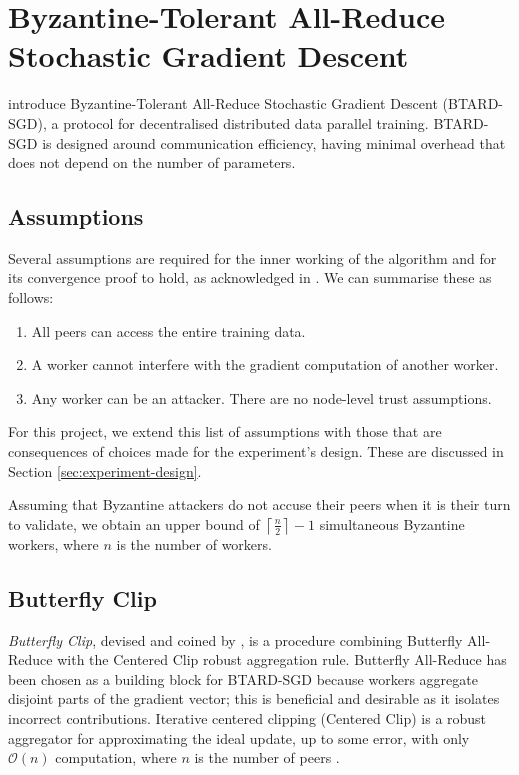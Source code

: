 \documentclass{article}
\begin{document}
\section{Byzantine-Tolerant All-Reduce Stochastic Gradient Descent}

\cite{gorbunov2021secure} introduce Byzantine-Tolerant All-Reduce Stochastic Gradient Descent (BTARD-SGD), a protocol for decentralised distributed data parallel training. BTARD-SGD is designed around communication efficiency, having minimal overhead that does not depend on the number of parameters. 

\subsection{Assumptions}
Several assumptions are required for the inner working of the algorithm and for its convergence proof to hold, as acknowledged in \cite{gorbunov2021secure}. We can summarise these as follows:
\begin{enumerate}
\item All peers can access the entire training data.
\item A worker cannot interfere with the gradient computation of another worker. 
\item Any worker can be an attacker. There are no node-level trust assumptions.
\end{enumerate}

For this project, we extend this list of assumptions with those that are consequences of choices made for the experiment's design. These are discussed in Section \ref{sec:experiment-design}.

Assuming that Byzantine attackers do not accuse their peers when it is their turn to validate, we obtain an upper bound of $\left\lceil\frac{n}{2}\right\rceil-1$ simultaneous Byzantine workers, where $n$ is the number of workers.

\subsection{Butterfly Clip}
\textit{Butterfly Clip}, devised and coined by \cite{gorbunov2021secure}, is a procedure combining Butterfly All-Reduce with the Centered Clip robust aggregation rule. Butterfly All-Reduce has been chosen as a building block for BTARD-SGD because workers aggregate disjoint parts of the gradient vector; this is beneficial and desirable as it isolates incorrect contributions. Iterative centered clipping (Centered Clip) is a robust aggregator for approximating the ideal update, up to some error, with only $\mathcal{O}(n)$ computation, where $n$ is the number of peers \citep{karimireddy2021learning}. 
\end{document}
